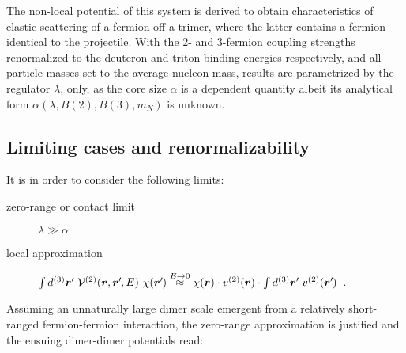 \documentclass[onecolumn,preprint,superscriptaddress,nofootinbib,notitlepage,10pt,linenumbers]{revtex4-1}
\newcommand*{\mprime}{^{\prime}\mkern-1.2mu}
\newcommand{\ve}[1]{\ensuremath{\boldsymbol{#1}}}
\begin{document}
The non-local potential of this system is derived to obtain characteristics of elastic scattering of a fermion off a trimer,
where the latter contains a fermion identical to the projectile. With the 2- and 3-fermion coupling strengths renormalized to
the deuteron and triton binding energies respectively, and all particle masses set to the average nucleon mass, results
are parametrized by the regulator $\lambda$, only, as the core size $\alpha$ is a dependent quantity albeit its analytical
form  $\alpha(\lambda,B(2),B(3),m_N)$ is unknown.



\subsection{Limiting cases and renormalizability}

It is in order to consider the following limits: 
\begin{description}
\item[zero-range or contact limit]$\lambda\gg\alpha$
\item[local approximation]
$\int d^{(3)}\ve{r}\mprime~\mathcal{V}^{(2)}(\ve{r},\ve{r}\mprime,E)~\chi(\ve{r}\mprime)\stackrel{E\to 0}{\approx}
\chi(\ve{r})\cdot v^{(2)}(\ve{r})\cdot\int d^{(3)}\ve{r}\mprime~v^{(2)}(\ve{r}\mprime)$~.
\end{description}

Assuming an unnaturally large dimer scale emergent from a relatively short-ranged fermion-fermion interaction,
the zero-range approximation is justified and the ensuing dimer-dimer potentials read:
\end{document}
